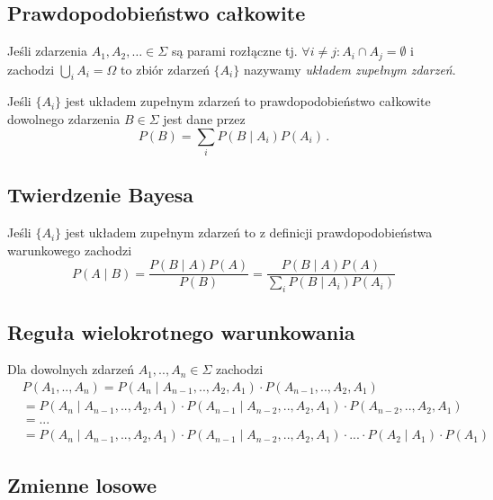 \documentclass{myclass}
\begin{document}
\subsection{Prawdopodobieństwo całkowite}

Jeśli zdarzenia \(A_1, A_2, \ldots \in \Sigma\) są parami rozłączne tj. \(\forall i \neq j : A_i
\cap A_j = \emptyset\) i zachodzi \(\bigcup_i A_i = \Omega\) to zbiór zdarzeń \(\{A_i\}\) nazywamy
\textit{układem zupełnym zdarzeń}.

Jeśli \(\{A_i\}\) jest układem zupełnym zdarzeń to prawdopodobieństwo całkowite dowolnego zdarzenia
\(B \in \Sigma\) jest dane przez
\begin{equation*}
    P(B) = \sum_i P(B \mid A_i) P(A_i)\,.
\end{equation*}

\subsection{Twierdzenie Bayesa}

Jeśli \(\{A_i\}\) jest układem zupełnym zdarzeń to z definicji prawdopodobieństwa warunkowego zachodzi
\begin{equation*}
    P(A \mid B) = \frac{P(B \mid A) P(A)}{P(B)} = \frac{P(B \mid A) P(A)}{\sum_{i} P(B \mid A_i) P(A_i)}
\end{equation*}

\subsection{Reguła wielokrotnego warunkowania}

Dla dowolnych zdarzeń \(A_1,..,A_n \in \Sigma\) zachodzi
\begin{equation*}
    \begin{split}
        &P(A_1,..,A_n) = P(A_n \mid A_{n-1},..,A_2,A_1) \cdot P(A_{n-1},..,A_2,A_1) \\
        &= P(A_n \mid A_{n-1},..,A_2,A_1) \cdot P(A_{n-1} \mid A_{n-2},..,A_2,A_1) \cdot P(A_{n-2},..,A_2,A_1)\\
        &= ...\\
        &= P(A_n \mid A_{n-1},..,A_2,A_1)\cdot P(A_{n-1} \mid A_{n-2},..,A_2,A_1) \cdot ... \cdot P(A_2 \mid A_1) \cdot P(A_1)
    \end{split}
\end{equation*} 

\subsection{Zmienne losowe}
\end{document}
